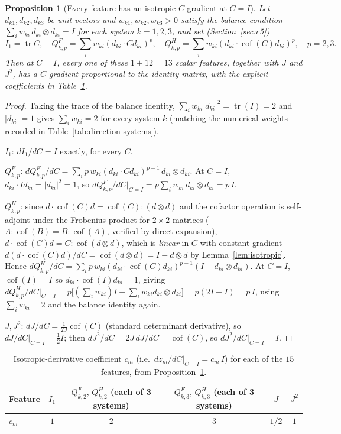 \documentclass[10pt,a4paper]{article}
\newtheorem{proposition}{Proposition}
\newcommand{\Cof}{\operatorname{cof}}
\newcommand{\tr}{\operatorname{tr}}
\begin{document}
\begin{proposition}[Every feature has an isotropic $C$-gradient at $C=I$]
\label{prop:isotropic-features}
Let $d_{k1},d_{k2},d_{k3}$ be unit vectors and $w_{k1},w_{k2},w_{k3}>0$
satisfy the balance condition $\sum_iw_{ki}\,d_{ki}\otimes d_{ki}=I$ for
each system $k=1,2,3$, and set (Section~\ref{sec:c5})
\[
 I_1=\tr C,\quad
 Q_{k,p}^F=\sum_iw_{ki}(d_{ki}\cdot Cd_{ki})^p,\quad
 Q_{k,p}^H=\sum_iw_{ki}(d_{ki}\cdot\Cof(C)d_{ki})^p,\quad p=2,3.
\]
Then at $C=I$, every one of these $1+12=13$ scalar features, together
with $J$ and $J^2$, has a $C$-gradient proportional to the identity
matrix, with the explicit coefficients in Table~\ref{tab:coefficients}.
\end{proposition}
\begin{proof}
Taking the trace of the balance identity, $\sum_iw_{ki}|d_{ki}|^2=
\tr(I)=2$ and $|d_{ki}|=1$ gives $\sum_iw_{ki}=2$ for every system $k$
(matching the numerical weights recorded in
Table~\ref{tab:direction-systems}).

\emph{$I_1$}: $dI_1/dC=I$ exactly, for every $C$.

\emph{$Q_{k,p}^F$}: $dQ_{k,p}^F/dC=\sum_ip\,w_{ki}(d_{ki}\cdot Cd_{ki})^{p-1}\,
d_{ki}\otimes d_{ki}$.  At $C=I$, $d_{ki}\cdot Id_{ki}=|d_{ki}|^2=1$, so
$dQ_{k,p}^F/dC|_{C=I}=p\sum_iw_{ki}\,d_{ki}\otimes d_{ki}=p\,I$.

\emph{$Q_{k,p}^H$}: since $d\cdot\Cof(C)d=\Cof(C):(d\otimes d)$ and the
cofactor operation is self-adjoint under the Frobenius product for
$2\times2$ matrices ($A:\Cof(B)=B:\Cof(A)$, verified by direct expansion),
$d\cdot\Cof(C)d=C:\Cof(d\otimes d)$, which is \emph{linear} in $C$ with
constant gradient $d(d\cdot\Cof(C)d)/dC=\Cof(d\otimes d)=I-d\otimes d$ by
Lemma~\ref{lem:isotropic}.  Hence
$dQ_{k,p}^H/dC=\sum_ip\,w_{ki}(d_{ki}\cdot\Cof(C)d_{ki})^{p-1}(I-d_{ki}\otimes d_{ki})$.
At $C=I$, $\Cof(I)=I$ so $d_{ki}\cdot\Cof(I)d_{ki}=1$, giving
$dQ_{k,p}^H/dC|_{C=I}=p\big[(\textstyle\sum_iw_{ki})I-\sum_iw_{ki}d_{ki}\otimes d_{ki}\big]
=p(2I-I)=p\,I$, using $\sum_iw_{ki}=2$ and the balance identity again.

\emph{$J,J^2$}: $dJ/dC=\tfrac1{2J}\Cof(C)$ (standard determinant
derivative), so $dJ/dC|_{C=I}=\tfrac12I$; then $dJ^2/dC=2J\,dJ/dC=\Cof(C)$,
so $dJ^2/dC|_{C=I}=I$.
\end{proof}

\begin{table}[h]
\centering
\caption{Isotropic-derivative coefficient $c_m$ (i.e.\ $dz_m/dC|_{C=I}=c_m\,I$)
for each of the $15$ features, from Proposition~\ref{prop:isotropic-features}.}
\label{tab:coefficients}
\begin{tabular}{lccccc}
\toprule
Feature & $I_1$ & $Q_{k,2}^F,\,Q_{k,2}^H$ (each of 3 systems) & $Q_{k,3}^F,\,Q_{k,3}^H$ (each of 3 systems) & $J$ & $J^2$\\
\midrule
$c_m$ & $1$ & $2$ & $3$ & $1/2$ & $1$\\
\bottomrule
\end{tabular}
\end{table}
\end{document}
